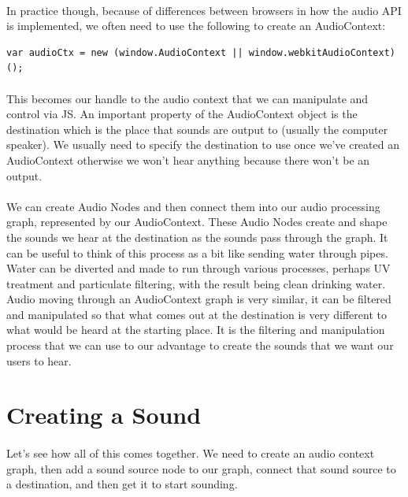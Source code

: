 \paragraph{} In practice though, because of differences between browsers in how the audio API is implemented, we often need to use the following to create an AudioContext:

\begin{lstlisting}
var audioCtx = new (window.AudioContext || window.webkitAudioContext)();
\end{lstlisting}

\paragraph{} This becomes our handle to the audio context that we can manipulate and control via JS. An important property of the AudioContext object is the destination which is the place that sounds are output to (usually the computer speaker). We usually need to specify the destination to use once we've created an AudioContext otherwise we won't hear anything because there won't be an output.
\paragraph{} We can create Audio Nodes and then connect them into our audio processing graph, represented by our AudioContext. These Audio Nodes create and shape the sounds we hear at the destination as the sounds pass through the graph. It can be useful to think of this process as a bit like sending water through pipes. Water can be diverted and made to run through various processes, perhaps UV treatment and particulate filtering, with the result being clean drinking water. Audio moving through an AudioContext graph is very similar, it can be filtered and manipulated so that what comes out at the destination is very different to what would be heard at the starting place. It is the filtering and manipulation process that we can use to our advantage to create the sounds that we want our users to hear.


\section{Creating a Sound}
\paragraph{} Let's see how all of this comes together. We need to create an audio context graph, then add a sound source node to our graph, connect that sound source to a destination, and then get it to start sounding.
